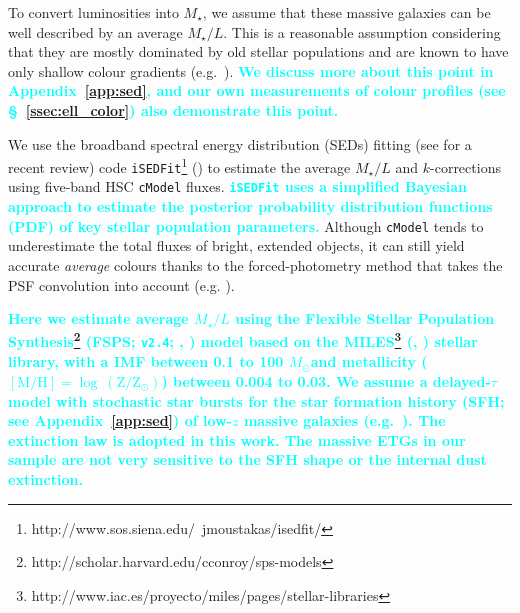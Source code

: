\documentclass[fleqn,usenatbib]{mnras}
\def\msun{$M_\odot$}
\def\cmodel{\texttt{cModel}}
\def\mstar{{$M_{\star}$}}
\def\m2l{{$M_{\star}/L$}}
\newcommand{\song}[1]{\textcolor{cyan}{\textbf{#1}}}
\begin{document}
    To convert luminosities into \mstar{}, we assume that these massive galaxies 
    can be well described by an average \m2l{}. 
    This is a reasonable assumption considering that they are mostly dominated by 
    old stellar populations and are known to have only shallow colour gradients
    (e.g.\ \citealt{Carollo1993, Davies1993, LaBarbera2012, DSouza2014}). 
    \song{
    We discuss more about this point in Appendix~\ref{app:sed}, and our own 
    measurements of colour profiles (see \S~\ref{ssec:ell_color}) also demonstrate 
    this point. 
    }
  
    We use the broadband spectral energy distribution (SEDs) fitting 
    (see \citealt{Walcher2011} for a recent review) code 
    \texttt{iSEDFit}\footnote{http://www.sos.siena.edu/~jmoustakas/isedfit/} 
    (\citealt{Moustakas13}) to estimate the average \m2l{} and $k$-corrections using
    five-band HSC \cmodel{} fluxes.
    \song{
    \texttt{iSEDFit} uses a simplified Bayesian approach to estimate the 
    posterior probability distribution functions (PDF) of key stellar population
    parameters.
    }
    Although \cmodel{} tends to underestimate the total fluxes of bright, extended 
    objects, it can still yield accurate \emph{average} colours thanks to the 
    forced-photometry method that takes the PSF convolution into account
    (e.g. \citealt{SynPipe}). 
    
    \song{
    Here we estimate average \m2l{} using the Flexible Stellar Population 
    Synthesis\footnote{http://scholar.harvard.edu/cconroy/sps-models}
    (FSPS; \texttt{v2.4}; \citealt{FSPS}, \citealt{Conroy2010}) model based on the 
    MILES\footnote{http://www.iac.es/proyecto/miles/pages/stellar-libraries}
    (\citealt{MILES1}, \citealt{MILES2}) stellar library, with a
    \citet{Chabrier2003} IMF between 0.1 to 100 \msun and metallicity 
    ($[\mathrm{M}/\mathrm{H}]=\log\ (\mathrm{Z}/\mathrm{Z}_{\odot})$) between 
    0.004 to 0.03. 
    We assume a delayed-$\tau$ model with stochastic star bursts 
    for the star formation history (SFH; see Appendix~\ref{app:sed}) of low-$z$ 
    massive galaxies (e.g.\ \citealt{Kauffmann2003}). 
    The \citet{Calzetti2000} extinction law is adopted in this work.
    The massive ETGs in our sample are not very sensitive to the SFH shape or the 
    internal dust extinction. 
    }
    
\end{document}

